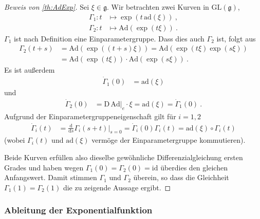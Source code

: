 \documentclass[10pt,a4paper]{article}
\theoremstyle{mytheorem}
\theoremstyle{mydefinition}
\newcommand{\dt}{\mathrm{d}}
\newcommand{\Dt}{\mathrm{D}}
\newcommand{\ad}{\mathrm{ad}}
\newcommand{\Ad}{\mathrm{Ad}}
\begin{document}
\begin{proof}[Beweis von \ref{th:AdExp}]
Sei $\xi\in\mathfrak{g}$.
Wir betrachten zwei Kurven in $\mathrm{GL}(\mathfrak{g})$,
\begin{align*}
	\Gamma_1: t&\mapsto \exp(t\,\ad(\xi))
	\ ,\\
	\Gamma_2: t&\mapsto \Ad(\exp(t\xi))
	\ .
\end{align*}
$\Gamma_1$ ist nach Definition eine Einparametergruppe.
Dass dies auch $\Gamma_2$ ist, folgt aus
\begin{align*}
	\Gamma_2(t+s)
	&= \Ad(\exp((t+s)\xi))
	= \Ad(\exp(t\xi)\exp(s\xi))
	\nonumber\\
	&= \Ad(\exp(t\xi))\cdot\Ad(\exp(s\xi))
	\ .
\end{align*}
Es ist außerdem
\begin{align*}
	\dot{\Gamma}_1(0)
	&= \ad(\xi)
\end{align*}
und
\begin{align*}
	\dot{\Gamma}_2(0)
	&= \Dt\,\Ad|_e\cdot \xi = \ad(\xi) = \dot{\Gamma}_1(0)
	\ .
\end{align*}
Aufgrund der Einparametergruppeneigenschaft gilt für $i=1,2$
\begin{align*}
	\dot{\Gamma}_i(t)
	&=
	\frac{\dt}{\dt s}
	\Gamma_i(s+t)
	\Big|_{s=0}
	= \dot{\Gamma}_i(0)\Gamma_i(t)
	= \ad(\xi)\circ\Gamma_i(t)
\end{align*}
(wobei $\Gamma_i(t)$ und $\ad(\xi)$ vermöge der Einparametergruppe kommutieren).

Beide Kurven erfüllen also dieselbe gewöhnliche Differenzialgleichung ersten Grades und haben wegen $\Gamma_1(0)=\Gamma_2(0)=\mathrm{id}$ überdies den gleichen Anfangswert.
Damit stimmen $\Gamma_1$ und $\Gamma_2$ überein, 
so dass die Gleichheit $\Gamma_1(1)=\Gamma_2(1)$ die zu zeigende Aussage ergibt.
\end{proof}

\subsubsection{Ableitung der Exponentialfunktion}
\end{document}
